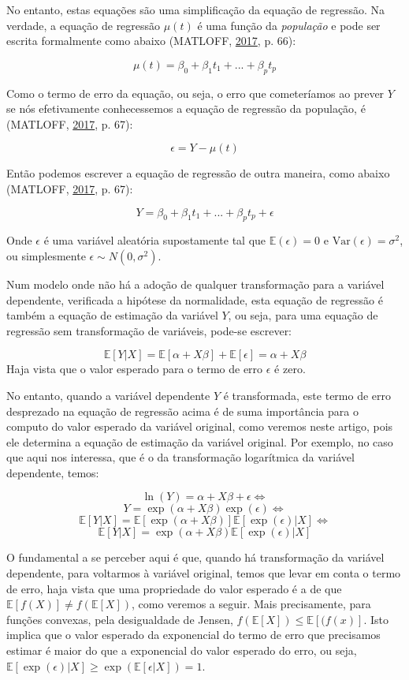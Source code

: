 \documentclass[a4paper, 12pt]{article}
\begin{document}
No entanto, estas equações são uma simplificação da equação de
regressão. Na verdade, a equação de regressão \(\mu(t)\) é uma função da
\emph{população} e pode ser escrita formalmente como abaixo (MATLOFF,
\protect\hyperlink{ref-matloff2017}{2017}, p. 66):

\[\mu(t) = \beta_0 + \beta_1t_1 + ... + \beta_p t_p\]

Como o termo de erro da equação, ou seja, o erro que cometeríamos ao
prever \(Y\) se nós efetivamente conhecessemos a equação de regressão da
população, é (MATLOFF, \protect\hyperlink{ref-matloff2017}{2017}, p.
67):

\[\epsilon = Y - \mu(t)\]

Então podemos escrever a equação de regressão de outra maneira, como
abaixo (MATLOFF, \protect\hyperlink{ref-matloff2017}{2017}, p. 67):

\[Y = \beta_0 + \beta_1t_1 + ... + \beta_p t_p + \epsilon\]

Onde \(\epsilon\) é uma variável aleatória supostamente tal que
\(\mathbb{E}(\epsilon) = 0\) e \(\text{Var}(\epsilon) = \sigma^2\), ou
simplesmente \(\epsilon \sim N(0, \sigma^2)\).

Num modelo onde não há a adoção de qualquer transformação para a
variável dependente, verificada a hipótese da normalidade, esta equação
de regressão é também a equação de estimação da variável \(Y\), ou seja,
para uma equação de regressão sem transformação de variáveis, pode-se
escrever:

\[\mathbb{E}[Y|X] = \mathbb{E}[\alpha + X\beta] + \mathbb{E}[\epsilon] = \alpha + X\beta\]
Haja vista que o valor esperado para o termo de erro \(\epsilon\) é
zero.

No entanto, quando a variável dependente \(Y\) é transformada, este
termo de erro desprezado na equação de regressão acima é de suma
importância para o computo do valor esperado da variável original, como
veremos neste artigo, pois ele determina a equação de estimação da
variável original. Por exemplo, no caso que aqui nos interessa, que é o
da transformação logarítmica da variável dependente, temos:

\[\ln(Y) = \alpha + X\beta + \epsilon \Leftrightarrow\]
\[Y = \exp(\alpha + X\beta)\exp(\epsilon) \Leftrightarrow\]
\[\mathbb{E}[Y|X] = \mathbb{E}[\exp(\alpha + X\beta)]\mathbb{E}[\exp(\epsilon)|X] \Leftrightarrow\]
\[\mathbb{E}[Y|X] = \exp(\alpha + X\beta)\mathbb{E}[\exp(\epsilon)|X]\]

O fundamental a se perceber aqui é que, quando há transformação da
variável dependente, para voltarmos à variável original, temos que levar
em conta o termo de erro, haja vista que uma propriedade do valor
esperado é a de que \(\mathbb{E}[f(X)] \ne f(\mathbb{E}[X])\), como
veremos a seguir. Mais precisamente, para funções convexas, pela
desigualdade de Jensen, \(f(\mathbb{E}[X]) \leq \mathbb{E}[(f(x)]\).
Isto implica que o valor esperado da exponencial do termo de erro que
precisamos estimar é maior do que a exponencial do valor esperado do
erro, ou seja,
\(\mathbb{E}[\exp(\epsilon)|X] \geq \exp(\mathbb{E}[\epsilon|X]) = 1\).
\end{document}
